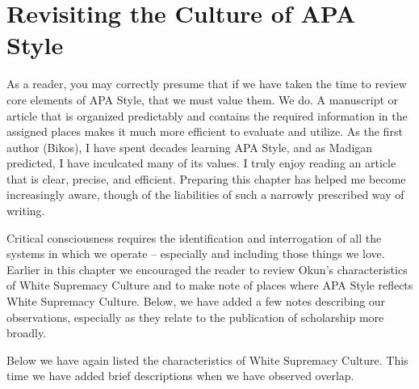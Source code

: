 \documentclass[
  11pt,
]{book}
\begin{document}
\hypertarget{revisiting-the-culture-of-apa-style}{%
\section{Revisiting the Culture of APA Style}\label{revisiting-the-culture-of-apa-style}}

As a reader, you may correctly presume that if we have taken the time to review core elements of APA Style, that we must value them. We do. A manuscript or article that is organized predictably and contains the required information in the assigned places makes it much more efficient to evaluate and utilize. As the first author (Bikos), I have spent decades learning APA Style, and as Madigan \citeyearpar{madigan_language_1995} predicted, I have inculcated many of its values. I truly enjoy reading an article that is clear, precise, and efficient. Preparing this chapter has helped me become increasingly aware, though of the liabilities of such a narrowly prescribed way of writing.

Critical consciousness requires the identification and interrogation of all the systems in which we operate -- especially and including those things we love. Earlier in this chapter we encouraged the reader to review Okun's \citeyearpar{okun_white_2021} characteristics of White Supremacy Culture and to make note of places where APA Style reflects White Supremacy Culture. Below, we have added a few notes describing our observations, especially as they relate to the publication of scholarship more broadly.

Below we have again listed the characteristics of White Supremacy Culture. This time we have added brief descriptions when we have observed overlap.
\end{document}
